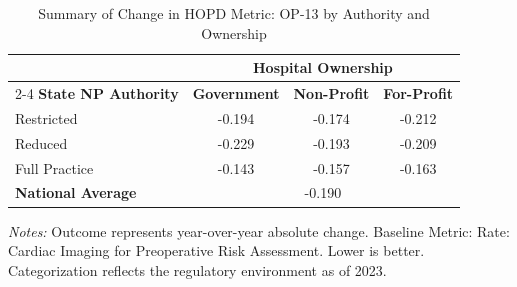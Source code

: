 \begin{table}[htbp]
    \centering
    \caption{Summary of Change in HOPD Metric: OP-13 by Authority and Ownership}
    \label{tab:d_hopd_op_13_own}
    \vspace{0.2cm}
    \begin{tabular}{lccc}
        \toprule
        & \multicolumn{3}{c}{\textbf{Hospital Ownership}} \\
        \cmidrule(lr){2-4}
        \textbf{State NP Authority} & \textbf{Government} & \textbf{Non-Profit} & \textbf{For-Profit} \\
        \midrule
        Restricted & -0.194 & -0.174 & -0.212 \\
        Reduced & -0.229 & -0.193 & -0.209 \\
        Full Practice & -0.143 & -0.157 & -0.163 \\
        \midrule
        \textbf{National Average} & \multicolumn{3}{c}{-0.190} \\
        \bottomrule
    \end{tabular}
    \vspace{0.1cm}
    \begin{minipage}{0.85\textwidth}
        \footnotesize \textit{Notes:} Outcome represents year-over-year absolute change. Baseline Metric: Rate: Cardiac Imaging for Preoperative Risk Assessment. Lower is better. Categorization reflects the regulatory environment as of 2023.
    \end{minipage}
\end{table}
